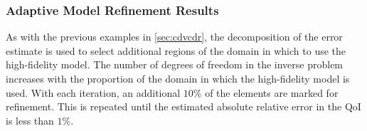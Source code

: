 \documentclass[review]{siamart0516}
\providecommand{\DIFdelend}{} %
\DeclareRobustCommand{\DIFdelend}{\DIFOaddend \let\includegraphics\DIFOincludegraphics} %
\begin{document}
\DIFdelend %
\subsubsection{Adaptive Model Refinement Results}

As with the previous examples in \cref{sec:cdvcdr}, the decomposition of the error estimate is used to select additional regions of the domain in which to use the high-fidelity model. The number of degrees of freedom in the inverse problem increases with the proportion of the domain in which the high-fidelity model is used. With each iteration, an additional $10\%$ of the elements are marked for refinement. This is repeated until the estimated absolute relative error in the QoI is less than $1\%$.
\end{document}
